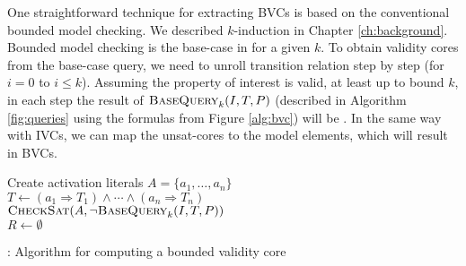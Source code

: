 One straightforward technique for extracting BVCs is based on the conventional bounded model checking.
We described $k$-induction in Chapter \ref{ch:background}. Bounded model checking is the base-case in \label{fig:k-induction} for a given $k$. To obtain validity cores from the base-case query, we need to unroll transition relation step by step (for $i=0$ to $i \leq k$). Assuming the property of interest is valid, at least up to bound $k$, in each step the result of $\textsc{BaseQuery}_k(I, T, P)$ (described in Algorithm \ref{fig:queries} using the formulas from Figure \ref{alg:bvc}) will be \unsat . In the same way with IVCs, we can map the unsat-cores to the model elements, which will result in BVCs.

\begin{algorithm}[t]
  \BlankLine
   Create activation literals $A = \{a_1, \ldots, a_n\}$ \\
  $T \leftarrow (a_1 \Rightarrow T_1) \land \cdots \land (a_n \Rightarrow T_n)$ \\
  $\textsc{CheckSat}(A, \neg\textsc{BaseQuery}_k(I, T, P))$ \\
  $R \leftarrow \emptyset$ \\
\caption{\bvcalg: Algorithm for computing a bounded validity core}
\label{alg:bvc}
\end{algorithm}

